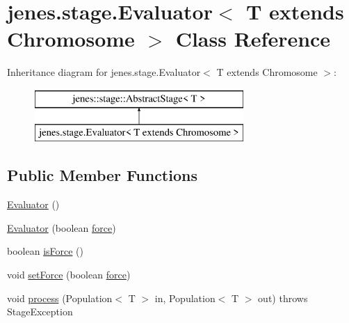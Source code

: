 \hypertarget{classjenes_1_1stage_1_1_evaluator_3_01_t_01extends_01_chromosome_01_4}{\section{jenes.\-stage.\-Evaluator$<$ T extends Chromosome $>$ Class Reference}
\label{classjenes_1_1stage_1_1_evaluator_3_01_t_01extends_01_chromosome_01_4}
}
Inheritance diagram for jenes.\-stage.\-Evaluator$<$ T extends Chromosome $>$\-:\begin{figure}[H]
\begin{center}
\leavevmode
\includegraphics[height=2.000000cm]{classjenes_1_1stage_1_1_evaluator_3_01_t_01extends_01_chromosome_01_4}
\end{center}
\end{figure}
\subsection*{Public Member Functions}
\begin{DoxyCompactItemize}
\item 
\hyperlink{classjenes_1_1stage_1_1_evaluator_3_01_t_01extends_01_chromosome_01_4_afe7302209d1e39a0267bf4320d6d298d}{Evaluator} ()
\item 
\hyperlink{classjenes_1_1stage_1_1_evaluator_3_01_t_01extends_01_chromosome_01_4_ad156e40a9579040474e6720f14c49919}{Evaluator} (boolean \hyperlink{classjenes_1_1stage_1_1_evaluator_3_01_t_01extends_01_chromosome_01_4_a8ad6c1bcd555e06450a444d2d18b6b89}{force})
\item 
boolean \hyperlink{classjenes_1_1stage_1_1_evaluator_3_01_t_01extends_01_chromosome_01_4_a617f44ce8de8d0e4bab8506e81038e76}{is\-Force} ()
\item 
void \hyperlink{classjenes_1_1stage_1_1_evaluator_3_01_t_01extends_01_chromosome_01_4_acd9d554678a83708eeb2d373def60e71}{set\-Force} (boolean \hyperlink{classjenes_1_1stage_1_1_evaluator_3_01_t_01extends_01_chromosome_01_4_a8ad6c1bcd555e06450a444d2d18b6b89}{force})
\item 
void \hyperlink{classjenes_1_1stage_1_1_evaluator_3_01_t_01extends_01_chromosome_01_4_a25aee75f7acf2406ca17526f588a8f15}{process} (Population$<$ T $>$ in, Population$<$ T $>$ out)  throws Stage\-Exception 
\end{DoxyCompactItemize}
